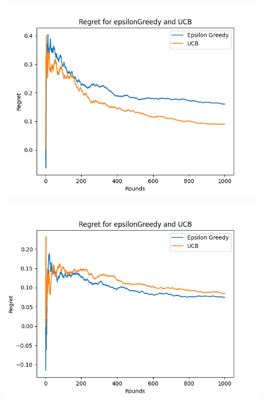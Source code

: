 \begin{figure}[h]
	\centering
	\begin{minipage}{.33\textwidth}
	  \centering
	  \includegraphics[width=\linewidth]{Images/regret_1000_UCB.png}
	  \label{fig:UCB_10000}
	\end{minipage}%
	\begin{minipage}{.33\textwidth}
	  \centering
	  \includegraphics[width=\linewidth]{Images/regret_1000_epsilon.png}
	  \label{fig:epsilon_10000}
	\end{minipage}
	\begin{minipage}{.33\textwidth}
		\centering

\end{minipage}
\end{figure}
